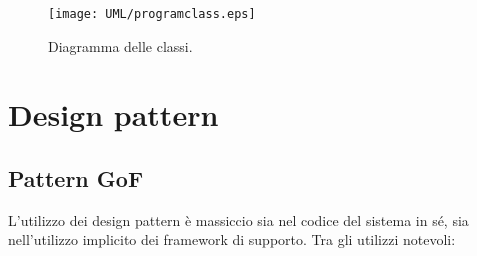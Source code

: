 \begin{figure}[ht]
	\centering
	\texttt{[image: UML/programclass.eps]}
	\caption{Diagramma delle classi.}
	\label{fig:programclassdiag}
\end{figure}


\section{Design pattern}\label{pattern}


\subsection{Pattern GoF}\label{GoF}
L'utilizzo dei design pattern è massiccio sia nel codice del sistema in sé, sia nell'utilizzo implicito dei framework di supporto. Tra gli utilizzi notevoli:
